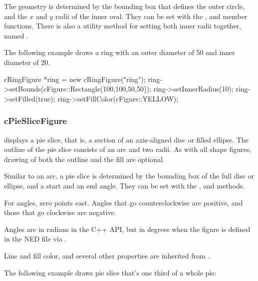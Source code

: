 The geometry is determined by the bounding box that defines the outer
circle, and the $x$ and $y$ radii of the inner oval. They can be set with
the ,  and 
member functions. There is also a utility method for setting both
inner radii together, named .

The following example draws a ring with an outer diameter of 50 and
inner diameter of 20.

\begin{cpp}
cRingFigure *ring = new cRingFigure("ring");
ring->setBounds(cFigure::Rectangle(100,100,50,50));
ring->setInnerRadius(10);
ring->setFilled(true);
ring->setFillColor(cFigure::YELLOW);
\end{cpp}


\begin{center}

\end{center}


\subsubsection{cPieSliceFigure}
\label{sec:graphics:pieslicefigure}

 displays a pie slice, that is, a section of an
axis-aligned disc or filled ellipse.  The outline of the pie slice consists
of an arc and two radii. As with all shape figures, drawing of both the
outline and the fill are optional.

Similar to an arc, a pie slice is determined by the bounding box of the
full disc or ellipse, and a start and an end angle. They can be set with
the ,  and 
methods.

For angles, zero points east. Angles that go counterclockwise are
positive, and those that go clockwise are negative.

\begin{note}
Angles are in radians in the C++ API, but in degrees when the figure is
defined in the NED file via .
\end{note}

Line and fill color, and several other properties are inherited from
.

The following example draws pie slice that's one third of a whole pie:

